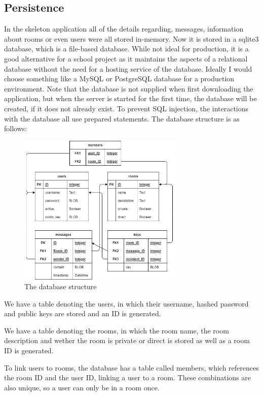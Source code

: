 \documentclass[a4paper]{article}
\begin{document}
\subsection{Persistence}
In the skeleton application all of the details regarding, messages, information about rooms or even users were all stored in-memory. Now it is stored in a sqlite3 database, which is a file-based database. While not ideal for production, it is a good alternative for a school project as it maintains the aspects of a relational database without the need for a hosting service of the database. Ideally I would choose something like a MySQL or PostgreSQL database for a production environment. Note that the database is not supplied when first downloading the application, but when the server is started for the first time, the database will be created, if it does not already exist. To prevent SQL injection, the interactions with the database all use prepared statements.
The database structure is as follows:
\begin{figure}[H]
    \centering
    \includegraphics[width=0.7\textwidth]{database.png}
    \caption{The database structure}
\end{figure}
We have a table denoting the users, in which their username, hashed password and public keys are stored and an ID is generated.

We have a table denoting the rooms, in which the room name, the room description and wether the room is private or direct is stored as well as a room ID is generated.

To link users to rooms, the database has a table called members, which references the room ID and the user ID, linking a user to a room. These combinations are also unique, so a user can only be in a room once.
\end{document}
